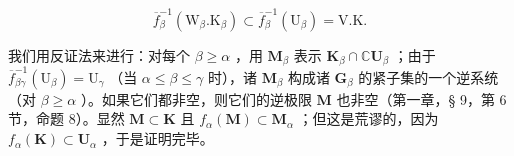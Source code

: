 \[
\overline {{f}} _ {\beta} ^ {-1} (\mathrm{W} _ {\beta}. \mathrm{K} _ {\beta}) \subset \overline {{f}} _ {\beta} ^ {-1} (\mathrm{U} _ {\beta}) = \mathrm{V}. \mathrm{K}.
\]

我们用反证法来进行：对每个 \(\beta \geqslant \alpha\) ，用 \(\mathbf{M}_{\beta}\) 表示 \(\mathbf{K}_{\beta} \cap \mathbb{C}\mathbf{U}_{\beta}\) ；由于 \(\overline{f}_{\beta \gamma}^{-1}(\mathrm{U}_{\beta}) = \mathrm{U}_{\gamma}\) （当 \(\alpha \leqslant \beta \leqslant \gamma\) 时），诸 \(\mathbf{M}_{\beta}\) 构成诸 \(\mathbf{G}_{\beta}\) 的紧子集的一个逆系统（对 \(\beta \geqslant \alpha\) ）。如果它们都非空，则它们的逆极限 \(\mathbf{M}\) 也非空（第一章，§ 9，第 6 节，命题 8）。显然 \(\mathbf{M} \subset \mathbf{K}\) 且 \(f_{\alpha}(\mathbf{M}) \subset \mathbf{M}_{\alpha}\) ；但这是荒谬的，因为 \(f_{\alpha}(\mathbf{K}) \subset \mathbf{U}_{\alpha}\) ，于是证明完毕。

